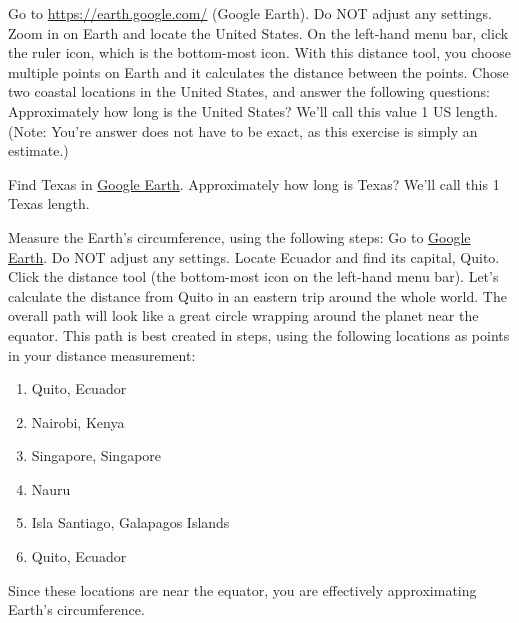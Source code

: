 \documentclass{article}
\numberwithin{equation}{section}
\numberwithin{figure}{section}
\begin{document}
\setlength{\columnsep}{1cm}


\begin{exercise} \label{uqgC3z}
    Go to \href{https://earth.google.com/}{https://earth.google.com/} (Google Earth). Do NOT adjust any settings. Zoom in on Earth and locate the United States. On the left-hand menu bar, click the ruler icon, which is the bottom-most icon. With this distance tool, you choose multiple points on Earth and it calculates the distance between the points. Chose two coastal locations in the United States, and answer the following questions: Approximately how long is the United States? We'll call this value 1 US length. (Note: You're answer does not have to be exact, as this exercise is simply an estimate.)
\end{exercise}

\begin{exercise}
    Find Texas in \href{https://earth.google.com/}{Google Earth}. Approximately how long is Texas? We'll call this 1 Texas length.
\end{exercise}

\begin{exercise} \label{VbC5xi}
Measure the Earth's circumference, using the following steps: Go to \href{https://earth.google.com/}{Google Earth}. Do NOT adjust any settings. Locate Ecuador and find its capital, Quito. Click the distance tool (the bottom-most icon on the left-hand menu bar). Let's calculate the distance from Quito in an eastern trip around the whole world. The overall path will look like a great circle wrapping around the planet near the equator. This path is best created in steps, using the following locations as points in your distance measurement:

\begin{enumerate}
\setlength\itemsep{-0.5ex}
    \item Quito, Ecuador
    \item Nairobi, Kenya
    \item Singapore, Singapore
    \item Nauru
    \item Isla Santiago, Galapagos Islands
    \item Quito, Ecuador
\end{enumerate}

Since these locations are near the equator, you are effectively approximating Earth's circumference.
\end{exercise}
\end{document}
